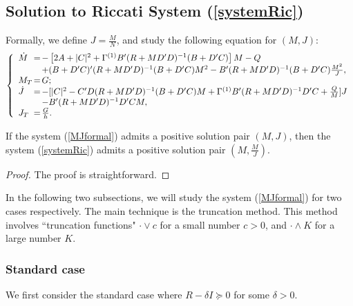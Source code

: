 \documentclass[final]{siamltex}
\begin{document}
\subsection{Solution to Riccati System (\ref{systemRic})}
Formally, we define $J=\frac{M}{N}$, and  study the following equation for $(M,J)$:
\begin{equation}\label{MJformal}
\left\{\begin{array}{lll}
\dot{M}\hspace{-0.3cm}&=&\hspace{-0.3cm}- \left[2A+|C|^2+\Gamma^{(1)} B'(R+MD'D)^{-1}(B+D'C)\right] M-Q\\
&&\hspace{-0.3cm}+(B+D'C)'(R+MD'D)^{-1}(B+D'C)M^2-B'(R+MD'D)^{-1}(B+D'C)\frac{M^2}{J},\\
M_T\hspace{-0.3cm}&=&\hspace{-0.3cm}G;\\
\dot{J}\hspace{-0.3cm}&=&\hspace{-0.3cm}-[|C|^2- C'D(R+MD'D)^{-1}(B+D'C)M+ \Gamma^{(1)} B'(R+MD'D)^{-1}D'C+\frac{Q}{M}] J \\
   &&\hspace{-0.3cm}-B'(R+MD'D)^{-1}D'C M,\\
 J_T\hspace{-0.3cm}&=&\hspace{-0.3cm}\frac{G}{h}.\\
\end{array}\right.
\end{equation}

\begin{proposition}\label{MJequivMN}
If the system (\ref{MJformal}) admits a positive solution pair $(M, J)$, then the system (\ref{systemRic})
admits a positive solution pair $(M, \frac{M}{J})$.
\end{proposition}

\begin{proof}
The proof is straightforward.
\end{proof}

In the following two subsections, we will study the system (\ref{MJformal}) for two cases respectively. The main technique
is the truncation method. This method involves  ``truncation functions"
$\cdot \vee c$ for a small number $c>0$,  and $\cdot\wedge K$ for a large number $K$.

\subsubsection{Standard case}
We first consider the standard case where 
$R-\delta I\succeq 0$ for some $\delta>0$.
\end{document}
